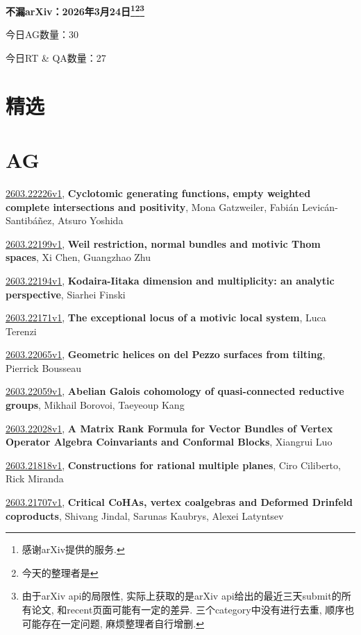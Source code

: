 \documentclass[9pt, a4paper]{article}
\theoremstyle{plain}
\theoremstyle{definition}
\theoremstyle{remark}
\newcommand{\arxiv}[3]{\href{https://arxiv.org/abs/#1}{#1}, \textbf{\textcolor{arxivblue}{#2}}, #3}
\newcommand{\AGnumber}{30}
\newcommand{\RTQAnumber}{27}
\newcommand{\NewestDate}{2026年3月24日}
\newcommand{\todayarXiver}{} %
\begin{document}
\begin{center}
    \Huge\textbf{不漏arXiv：\NewestDate\footnote{感谢arXiv提供的服务.}\footnote{今天的整理者是\todayarXiver}\footnote{由于arXiv api的局限性, 实际上获取的是arXiv api给出的最近三天submit的所有论文, 和recent页面可能有一定的差异. 三个category中没有进行去重, 顺序也可能存在一定问题, 麻烦整理者自行增删.}} \\
\end{center}

\setcounter{section}{-1}

\begin{center}
    今日AG数量：\AGnumber
    
    今日RT \& QA数量：\RTQAnumber
    
\end{center}


\section{精选}


\section{AG}
\arxiv{2603.22226v1}{Cyclotomic generating functions, empty weighted complete intersections and positivity}{Mona Gatzweiler, Fabián Levicán-Santibáñez, Atsuro Yoshida}

\arxiv{2603.22199v1}{Weil restriction, normal bundles and motivic Thom spaces}{Xi Chen, Guangzhao Zhu}

\arxiv{2603.22194v1}{Kodaira-Iitaka dimension and multiplicity: an analytic perspective}{Siarhei Finski}

\arxiv{2603.22171v1}{The exceptional locus of a motivic local system}{Luca Terenzi}

\arxiv{2603.22065v1}{Geometric helices on del Pezzo surfaces from tilting}{Pierrick Bousseau}

\arxiv{2603.22059v1}{Abelian Galois cohomology of quasi-connected reductive groups}{Mikhail Borovoi, Taeyeoup Kang}

\arxiv{2603.22028v1}{A Matrix Rank Formula for Vector Bundles of Vertex Operator Algebra Coinvariants and Conformal Blocks}{Xiangrui Luo}

\arxiv{2603.21818v1}{Constructions for rational multiple planes}{Ciro Ciliberto, Rick Miranda}

\arxiv{2603.21707v1}{Critical CoHAs, vertex coalgebras and Deformed Drinfeld coproducts}{Shivang Jindal, Sarunas Kaubrys, Alexei Latyntsev}
\end{document}
